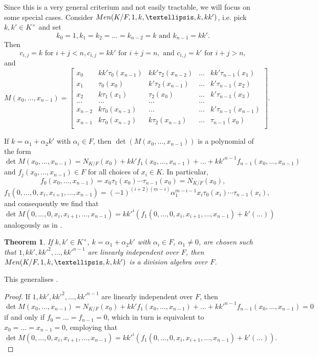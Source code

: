 \documentclass[11pt]{amsart}
\theoremstyle{plain}
\newtheorem{theorem}{Theorem}[section]
\theoremstyle{definition}
\begin{document}
Since this is a very general criterium and not easily tractable,  we will focus on some special cases.
Consider ${\rm Men}(K/F,1,k,\dots,k,kk')$, i.e. pick $k,k'\in K^\times$ and set
$$k_0=1, k_1=k_2=\dots =k_{n-2}=k \text{ and } k_{n-1}=kk'.$$
 Then
 $$c_{i,j}=k \text{ for } i+j<n, c_{i,j}=kk'  \text{ for } i+j=n,  \text{ and } c_{i,j}=k' \text{ for } i+j>n,$$
 and
 \[ M(x_0,\dots,x_{n-1})=\left [\begin {array}{ccccccc}
x_0 &  kk'\tau_0(x_{n-1}) & kk' \tau_2(x_{n-2}) &... & kk' \tau_{n-1}(x_{1})\\
x_1 & \tau_0(x_0) & k' \tau_2(x_{n-1})&... &  k' \tau_{n-1}(x_{2})\\
x_2 & k\tau_1(x_{1}) & \tau_2(x_0) & ... & k' \tau_{n-1}(x_{3})\\
...& ...  & ... & ...\\
x_{n-2} &  k\tau_0(x_{n-3})  & ...& ...& k' \tau_{n-1}(x_{n-1})\\
x_{n-1} &  k\tau_0(x_{n-2}) &   k \tau_2(x_{n-3})  & ...& \tau_{n-1}(x_{0})\\
\end {array}\right ].
 \]

If $k=\alpha_1+\alpha_2k'$ with $\alpha_i\in F$, then $\det(M(x_0,\dots,x_{n-1}))$ is a polynomial of the form
$$\det M(x_0,\dots,x_{n-1})=N_{K/F}(x_0)+kk'f_1(x_0,\dots,x_{n-1})+\dots +kk'^{n-1}f_{n-1}(x_0,\dots,x_{n-1})$$
and $f_j(x_0,\dots,x_{n-1})\in F$ for all choices of $x_i\in K$. In particular,
$$f_0(x_0,\dots,x_{n-1})=x_0\tau_1(x_0)\cdots\tau_{n-1}(x_0)=N_{K/F}(x_0),$$
$$f_1(0,\dots,0,x_i,x_{i+1},\dots,x_{n-1})=(-1)^{(i+2)(m-i)}\alpha_1^{m-i-1}x_i \tau_0(x_i)\cdots \tau_{n-1}(x_i),$$
and consequently we find that
$$\det M(0,\dots,0,x_i,x_{i+1},\dots,x_{n-1})=kk'^i(f_1(0,\dots,0,x_i,x_{i+1},\dots,x_{n-1})+k'(\dots))$$
analogously as in \cite{M}.


\begin{theorem}\label{thm:main1}
If $k,k'\in K^\times$, $k=\alpha_1+\alpha_2k'$ with $\alpha_i\in F$, $\alpha_1\not=0$, are chosen such that $1,kk',kk'^2,\dots,kk'^{n-1}$ are linearly independent over $F$, then
${\rm Men}(K/F,1,k,\dots,k,kk')$ is a division algebra over $F$.
 \end{theorem}

 This generalises \cite[p. 344]{M}.

 \begin{proof}
 If $1,kk',kk'^2,\dots,kk'^{n-1}$ are linearly independent over $F$, then
 $$\det M(x_0,\dots,x_{n-1})=N_{K/F}(x_0)+kk'f_1(x_0,\dots,x_{n-1})+\dots +kk'^{n-1}f_{n-1}(x_0,\dots,x_{n-1})=0$$
  if and only if
 $f_0=\dots =f_{n-1}=0$, which in turn is equivalent to $x_0=\dots=x_{n-1}=0$, employing that
 $$\det M(0,\dots,0,x_i,x_{i+1},\dots,x_{n-1})=kk'^i(f_1(0,\dots,0,x_i,x_{i+1},\dots,x_{n-1})+k'(\dots)).$$
 \end{proof}
\end{document}
